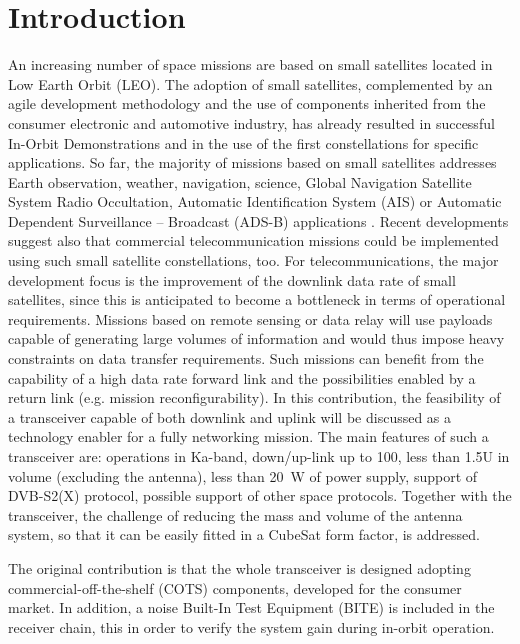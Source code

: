 \documentclass[conference,10pt,a4paper]{IEEEtran}%
\begin{document}
\section{Introduction}
An increasing number of space missions are based on small satellites located in Low Earth Orbit (LEO).
The adoption of small satellites, complemented by an agile development methodology and the use of components inherited from the consumer electronic and automotive industry, has already resulted in successful In-Orbit Demonstrations and in the use of the first constellations for specific applications.
So far, the majority of missions based on small satellites addresses Earth observation, weather, navigation, science, Global Navigation Satellite System Radio Occultation, Automatic Identification System (AIS) or Automatic Dependent Surveillance -- Broadcast (ADS-B) applications \cite{Gregorio2016}.
Recent developments suggest also that commercial telecommunication missions could be implemented using such small satellite constellations, too.
For telecommunications, the major development focus is the improvement of the downlink data rate of small satellites, since this is anticipated to become a bottleneck in terms of operational requirements.
Missions based on remote sensing or data relay will use payloads capable of generating large volumes of information and would thus impose heavy constraints on data transfer requirements.
Such missions can benefit from the capability of a high data rate forward link and the possibilities enabled by a return link (e.g. mission reconfigurability).
In this contribution, the feasibility of a transceiver capable of both downlink and uplink will be discussed as a technology enabler for a fully networking mission.
The main features of such a  transceiver are: operations in Ka-band, down/up-link up to \SI{100}{\Mbps}, less than 1.5U in volume (excluding the antenna), less than \SI{20}{\W} of power supply, support of DVB-S2(X) protocol, possible support of other space protocols.
Together with the transceiver, the challenge of reducing the mass and volume of the antenna system, so that it can be easily fitted in a CubeSat form factor, is addressed.

The original contribution is that the whole transceiver is designed adopting commercial-off-the-shelf (COTS) components, developed for the consumer market.
In addition, a noise Built-In Test Equipment (BITE) is included in the receiver chain, this in order to verify the system gain during in-orbit operation.
\end{document}
